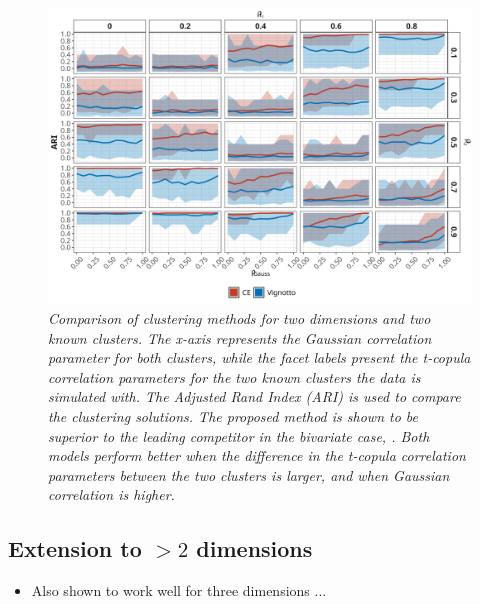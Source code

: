 \documentclass{article}
\numberwithin{equation}{section}
\begin{document}
\begin{figure}[H]
    \centering
    \includegraphics[width = 0.9\linewidth]{plots/sim_01b_ce_vs_vi_dqu_0.9.png}
    \caption{\emph{Comparison of clustering methods for two dimensions and two known clusters. The x-axis represents the Gaussian correlation parameter for both clusters, while the facet labels present the t-copula correlation parameters for the two known clusters the data is simulated with. The Adjusted Rand Index (ARI) is used to compare the clustering solutions. The proposed method is shown to be superior to the leading competitor in the bivariate case, \cite{Vignotto2021}. Both models perform better when the difference in the t-copula correlation parameters between the two clusters is larger, and when Gaussian correlation is higher.}}
    \label{fig:01_ce_vs_vi}
\end{figure}


\subsection{Extension to $>2$ dimensions} \label{subsec:sim_extension}

\begin{itemize}
    \item Also shown to work well for three dimensions ...
\end{itemize}
\end{document}
